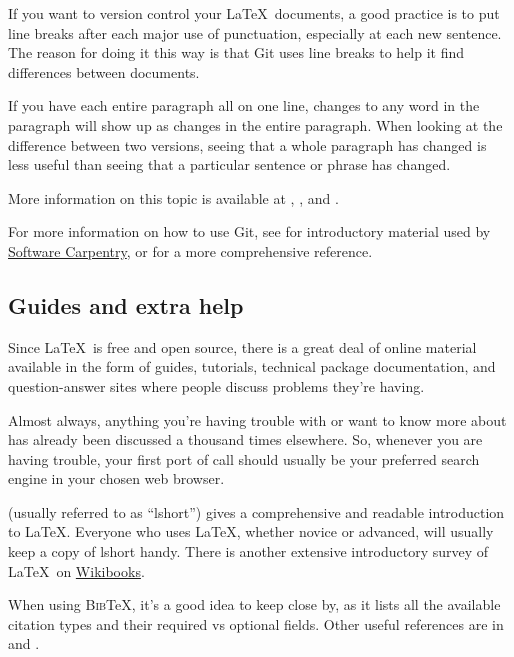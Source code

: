 If you want to version control your \LaTeX\ documents,
a good practice is to put line breaks after each major use of punctuation,
especially at each new sentence.
The reason for doing it this way is that Git uses 
line breaks to help it find differences between documents.

If you have each entire paragraph all on one line,
changes to any word in the paragraph will show up as changes
in the entire paragraph.
When looking at the difference between two versions,
seeing that a whole paragraph has changed is less useful
than seeing that a particular sentence or phrase has changed.

More information on this topic is available at
\citet{stackoverflow-git+latex-workflow},
\citet{tex-stackexchange-git-latex-and-branches-workflow},
and \citet{allen-collaborating-with-latex-and-git}.

For more information on how to use Git, see
\citet{gonzalez-huang-swc-git-novice} for introductory
material used by \href{http://www.software-carpentry.org}{Software Carpentry},
or \citet{chacon-pro-git-2014} for a more comprehensive reference.


\subsection{Guides and extra help}

Since \LaTeX\ is free and open source, there is a great deal
of online material available in the form of guides, tutorials,
technical package documentation,
and question-answer sites where people discuss problems they're having.

Almost always, anything you're having trouble with or want to know
more about has already been discussed a thousand times elsewhere.
So, whenever you are having trouble, your first port of call should usually
be your preferred search engine in your chosen web browser.

\citet{oetiker-lshort-2015} (usually referred to as ``lshort'')
gives a comprehensive and readable introduction to \LaTeX.
Everyone who uses \LaTeX, whether novice or advanced,
will usually keep a copy of lshort handy.
There is another extensive introductory survey of \LaTeX\ on
\href{https://en.wikibooks.org/wiki/LaTeX}{Wikibooks}.

When using \textsc{Bib}\TeX, it's a good idea to keep \citet{patashnik-bibtex-1988}
close by, as it lists all the available citation types and their
required vs optional fields.
Other useful references are in \citet{markey-ttb-2009}
and \citet{daly-natbib-2010}.

